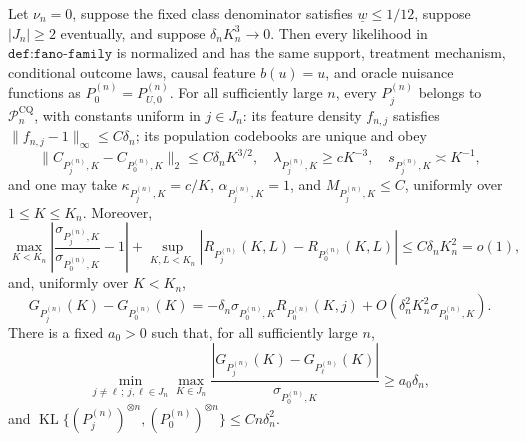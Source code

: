 Let \(\nu_n=0\), suppose the fixed class denominator satisfies \(\underline w\leq1/12\), suppose \(|J_n|\geq2\) eventually, and suppose \(\delta_nK_n^3\to0\).  Then every likelihood in \(\texttt{def:fano-family}\) is normalized and has the same support, treatment mechanism, conditional outcome laws, causal feature \(b(u)=u\), and oracle nuisance functions as \(P_0^{(n)}=P_{U,0}^{(n)}\).  For all sufficiently large \(n\), every \(P_j^{(n)}\) belongs to \(\mathcal P_n^{\mathrm{CQ}}\), with constants uniform in \(j\in J_n\): its feature density \(f_{n,j}\) satisfies \(\|f_{n,j}-1\|_\infty\leq C\delta_n\); its population codebooks are unique and obey
\[
 \|C_{P_j^{(n)},K}-C_{P_0^{(n)},K}\|_2\leq C\delta_nK^{3/2},\quad
 \lambda_{P_j^{(n)},K}\geq cK^{-3},\quad
 s_{P_j^{(n)},K}\asymp K^{-1},
\]
and one may take \(\kappa_{P_j^{(n)},K}=c/K\), \(\alpha_{P_j^{(n)},K}=1\), and \(M_{P_j^{(n)},K}\leq C\), uniformly over \(1\leq K\leq K_n\).  Moreover,
\[
 \max_{K<K_n}\left|\frac{\sigma_{P_j^{(n)},K}}{\sigma_{P_0^{(n)},K}}-1\right|
 +\sup_{K,L<K_n}|R_{P_j^{(n)}}(K,L)-R_{P_0^{(n)}}(K,L)|
 \leq C\delta_nK_n^2=o(1),
\]
and, uniformly over \(K<K_n\),
\[
 G_{P_j^{(n)}}(K)-G_{P_0^{(n)}}(K)
 =-\delta_n\sigma_{P_0^{(n)},K}R_{P_0^{(n)}}(K,j)
 +O\!\left(\delta_n^2K_n^2\sigma_{P_0^{(n)},K}\right).
\]
There is a fixed \(a_0>0\) such that, for all sufficiently large \(n\),
\[
 \min_{j\ne\ell\,;\ j,\ell\in J_n}\max_{K\in J_n}
 \frac{|G_{P_j^{(n)}}(K)-G_{P_\ell^{(n)}}(K)|}{\sigma_{P_0^{(n)},K}}
 \geq a_0\delta_n,
\]
and \(\operatorname{KL}\{(P_j^{(n)})^{\otimes n},(P_0^{(n)})^{\otimes n}\}\leq Cn\delta_n^2\).